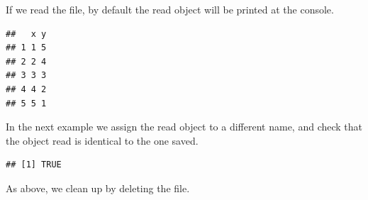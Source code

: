 \documentclass[krantz2]{krantz}\usepackage{knitr}
\begin{document}
\begin{knitrout}\footnotesize
{}\color{fgcolor}\begin{kframe}
\begin{alltt}
 \hlstd{)}
\end{alltt}
\end{kframe}
\end{knitrout}

If we read the file, by default the read \Rlang object will be printed at the console.

\begin{knitrout}\footnotesize
{}\color{fgcolor}\begin{kframe}
\begin{alltt}
\hlstd{(}\hlstd{)}
\end{alltt}
\begin{verbatim}
##   x y
## 1 1 5
## 2 2 4
## 3 3 3
## 4 4 2
## 5 5 1
\end{verbatim}
\end{kframe}
\end{knitrout}

In the next example we assign the read object to a different name, and check that the object read is identical to the one saved.

\begin{knitrout}\footnotesize
{}\color{fgcolor}\begin{kframe}
\begin{alltt}
 \hlkwb{<-} \hlstd{(}\hlstd{)}
\end{alltt}
\begin{verbatim}
## [1] TRUE
\end{verbatim}
\end{kframe}
\end{knitrout}

As above, we clean up by deleting the file.

\begin{knitrout}\footnotesize
{}\color{fgcolor}\begin{kframe}
\begin{alltt}
\hlstd{(}\hlstd{)}
\end{alltt}
\end{kframe}
\end{knitrout}
\end{document}
